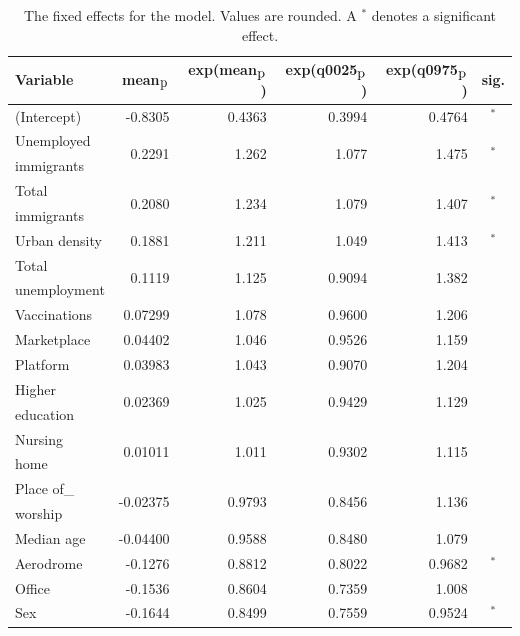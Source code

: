 \begin{table}[H]
\caption{The fixed effects for the model. Values are rounded. A $^*$ denotes a significant effect. \label{fixedAllNorway_nospatial}}
\begin{tabular}{l r r r r c}
\toprule
\textbf{Variable}	& \textbf{mean$_{\hbox{p}}$}	& \textbf{exp(mean$_{\hbox{p}}$)} & \textbf{exp(q0025$_{\hbox{p}}$)} & \textbf{exp(q0975$_{\hbox{p}}$)} & \textbf{sig.}\\
\midrule
(Intercept) & -0.8305 & 0.4363 & 0.3994 & 0.4764 & $^*$ \\
Unemployed & \multirow{2}{*}{0.2291} & \multirow{2}{*}{1.262} & \multirow{2}{*}{1.077} & \multirow{2}{*}{1.475} & \multirow{2}{*}{$^*$} \\
immigrants\\
Total & \multirow{2}{*}{0.2080}& \multirow{2}{*}{1.234}& \multirow{2}{*}{1.079}& \multirow{2}{*}{1.407}& \multirow{2}{*}{$^*$}\\
immigrants \\
Urban density & 0.1881 & 1.211 & 1.049 & 1.413 & $^*$ \\
Total & \multirow{2}{*}{0.1119} & \multirow{2}{*}{1.125} & \multirow{2}{*}{0.9094} & \multirow{2}{*}{1.382} \\
unemployment \\
Vaccinations & 0.07299 & 1.078 & 0.9600 & 1.206\\
Marketplace & 0.04402 & 1.046 & 0.9526 & 1.159 \\
Platform & 0.03983 & 1.043 & 0.9070 & 1.204 \\
Higher & \multirow{2}{*}{0.02369}& \multirow{2}{*}{1.025}& \multirow{2}{*}{0.9429}& \multirow{2}{*}{1.129}\\ 
education \\
Nursing & \multirow{2}{*}{0.01011} & \multirow{2}{*}{1.011} & \multirow{2}{*}{0.9302} & \multirow{2}{*}{1.115} \\
home\\
Place of\_ & \multirow{2}{*}{-0.02375}& \multirow{2}{*}{0.9793}& \multirow{2}{*}{0.8456}& \multirow{2}{*}{1.136} \\
worship \\
Median age & -0.04400 & 0.9588 & 0.8480 & 1.079 \\
Aerodrome & -0.1276 & 0.8812 & 0.8022 & 0.9682 & $^*$ \\
Office & -0.1536 & 0.8604 & 0.7359 & 1.008 \\
Sex & -0.1644 & 0.8499 & 0.7559 & 0.9524 & $^*$ \\
\bottomrule
\end{tabular}
\end{table}
\clearpage
